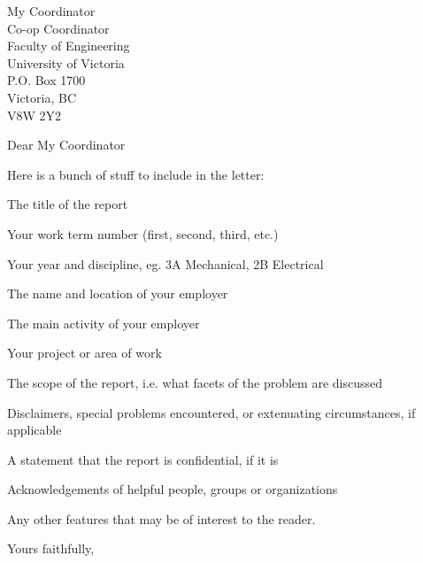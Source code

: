 \documentclass[11pt]{letter}
\begin{document}
\begin{letter}
	{	%
		My Coordinator \\
		Co-op Coordinator \\
		Faculty of Engineering \\ 
		University of Victoria \\
		P.O. Box 1700 \\
		Victoria, BC \\ 
		V8W 2Y2
	}

\opening{Dear My Coordinator}

Here is a bunch of stuff to include in the letter:
\begin{enumerate*}[label=(\roman*)]
	\item The title of the report
	\item  Your work term number (first, second, third, etc.)
	\item  Your year and discipline, eg. 3A Mechanical, 2B Electrical
	\item  The name and location of your employer
	\item  The main activity of your employer
	\item  Your project or area of work
	\item  The scope of the report, i.e. what facets of the problem are discussed
	\item  Disclaimers, special problems encountered, or extenuating circumstances, if applicable
	\item  A statement that the report is confidential, if it is
	\item  Acknowledgements of helpful people, groups or organizations
	\item  Any other features that may be of interest to the reader.
\end{enumerate*}

\closing{Yours faithfully,}


\end{letter}
\end{document}
